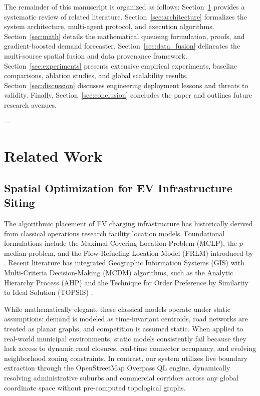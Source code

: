 \documentclass[preprint,12pt,authoryear]{elsarticle}
\begin{document}
The remainder of this manuscript is organized as follows: Section~\ref{sec:related} provides a systematic review of related literature. Section~\ref{sec:architecture} formalizes the system architecture, multi-agent protocol, and execution algorithms. Section~\ref{sec:math} details the mathematical queueing formulation, proofs, and gradient-boosted demand forecaster. Section~\ref{sec:data_fusion} delineates the multi-source spatial fusion and data provenance framework. Section~\ref{sec:experiments} presents extensive empirical experiments, baseline comparisons, ablation studies, and global scalability results. Section~\ref{sec:discussion} discusses engineering deployment lessons and threats to validity. Finally, Section~\ref{sec:conclusion} concludes the paper and outlines future research avenues.

---

\section{Related Work}
\label{sec:related}

\subsection{Spatial Optimization for EV Infrastructure Siting}
The algorithmic placement of EV charging infrastructure has historically derived from classical operations research facility location models. Foundational formulations include the Maximal Covering Location Problem (MCLP), the $p$-median problem, and the Flow-Refueling Location Model (FRLM) introduced by \citet{li2022stochastic}. Recent literature has integrated Geographic Information Systems (GIS) with Multi-Criteria Decision-Making (MCDM) algorithms, such as the Analytic Hierarchy Process (AHP) and the Technique for Order Preference by Similarity to Ideal Solution (TOPSIS) \citep{saaty1988analytic, chen2024spatial}.

While mathematically elegant, these classical models operate under static assumptions: demand is modeled as time-invariant centroids, road networks are treated as planar graphs, and competition is assumed static. When applied to real-world municipal environments, static models consistently fail because they lack access to dynamic road closures, real-time connector occupancy, and evolving neighborhood zoning constraints. In contrast, our system utilizes live boundary extraction through the OpenStreetMap Overpass QL engine, dynamically resolving administrative suburbs and commercial corridors across any global coordinate space without pre-computed topological graphs.
\end{document}
